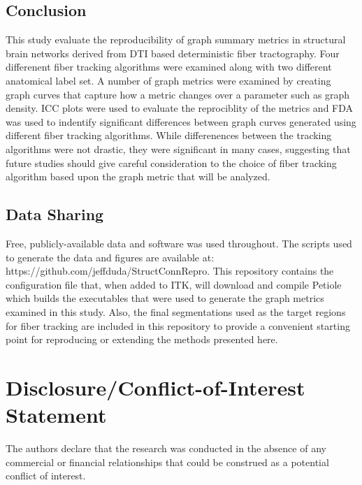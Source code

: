 \documentclass{frontiersSCNS} %
\begin{document}
\subsection{Conclusion}
This study evaluate the reproducibility of graph summary metrics in structural brain networks derived from
DTI based deterministic fiber tractography. Four differenent fiber tracking algorithms were examined along
with two different anatomical label set. A number of graph metrics were examined by creating graph curves that capture how a metric
changes over a parameter such as graph density. ICC plots were used to evaluate the reprociblity of the metrics and FDA
was used to indentify significant differences between graph curves generated using different fiber tracking algorithms.
While differenences between the tracking algorithms were not drastic, they were significant in many cases, suggesting
that future studies should give careful consideration to the choice of fiber tracking algorithm based upon the graph
metric that will be analyzed. 


\subsection{Data Sharing}
Free, publicly-available data and software was used throughout. The scripts used to generate the data and figures are available at: https://github.com/jeffduda/StructConnRepro. This repository contains the configuration file that, when added to ITK, will download and compile Petiole which builds the executables that were used to generate the graph metrics examined in this study. Also, the final segmentations used as the target regions for fiber tracking are included in this repository to provide a convenient starting point for reproducing or extending the methods presented here.

\section*{Disclosure/Conflict-of-Interest Statement}
The authors declare that the research was conducted in the absence of any commercial or financial relationships that could be construed as a potential conflict of interest.
\end{document}
